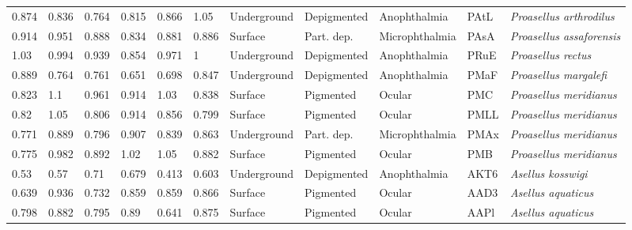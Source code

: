 \begin{tabular}{lllllllllll}
          0.874 &           0.836 &           0.764 &           0.815 &           0.866 &            1.05 &  Underground &  Depigmented &     Anophthalmia &     PAtL &          \textit{Proasellus arthrodilus} \\
          0.914 &           0.951 &           0.888 &           0.834 &           0.881 &           0.886 &      Surface &   Part. dep. &   Microphthalmia &     PAsA &         \textit{Proasellus assaforensis} \\
           1.03 &           0.994 &           0.939 &           0.854 &           0.971 &               1 &  Underground &  Depigmented &     Anophthalmia &     PRuE &               \textit{Proasellus rectus} \\
          0.889 &           0.764 &           0.761 &           0.651 &           0.698 &           0.847 &  Underground &  Depigmented &     Anophthalmia &     PMaF &            \textit{Proasellus margalefi} \\
          0.823 &             1.1 &           0.961 &           0.914 &            1.03 &           0.838 &      Surface &    Pigmented &           Ocular &      PMC &           \textit{Proasellus meridianus} \\
           0.82 &            1.05 &           0.806 &           0.914 &           0.856 &           0.799 &      Surface &    Pigmented &           Ocular &     PMLL &           \textit{Proasellus meridianus} \\
          0.771 &           0.889 &           0.796 &           0.907 &           0.839 &           0.863 &  Underground &   Part. dep. &   Microphthalmia &     PMAx &           \textit{Proasellus meridianus} \\
          0.775 &           0.982 &           0.892 &            1.02 &            1.05 &           0.882 &      Surface &    Pigmented &           Ocular &      PMB &           \textit{Proasellus meridianus} \\
           0.53 &            0.57 &            0.71 &           0.679 &           0.413 &           0.603 &  Underground &  Depigmented &     Anophthalmia &     AKT6 &                \textit{Asellus kosswigi} \\
          0.639 &           0.936 &           0.732 &           0.859 &           0.859 &           0.866 &      Surface &    Pigmented &           Ocular &     AAD3 &               \textit{Asellus aquaticus} \\
          0.798 &           0.882 &           0.795 &            0.89 &           0.641 &           0.875 &      Surface &    Pigmented &           Ocular &     AAPl &               \textit{Asellus aquaticus} \\

\end{tabular}
